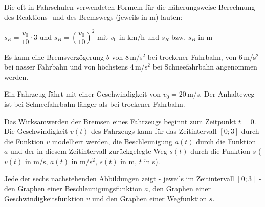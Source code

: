 \begin{langesbeispiel}
\begin{aufgabenstellung}
\item Die oft in Fahrschulen verwendeten Formeln für die näherungsweise Berechnung des Reaktions- und des Bremswegs (jeweils in m) lauten:

	$s_R=\dfrac{v_0}{10}\cdot 3$ und $s_B=\left(\dfrac{v_0}{10}\right)^2$ mit $v_0$ in km/h und $s_R$ bzw. $s_B$ in m%


\item Es kann eine Bremsverzögerung $b$ von 8\,m/s$^2$ bei trockener Fahrbahn, von 6\,m/s$^2$ bei nasser Fahrbahn und von höchstens 4\,m/s$^2$ bei Schneefahrbahn angenommen werden.%


Ein Fahrzeug fährt mit einer Geschwindigkeit von $v_0=20$\,m/s. Der Anhalteweg ist bei Schneefahrbahn länger als bei trockener Fahrbahn.


\item Das Wirksamwerden der Bremsen eines Fahrzeugs beginnt zum Zeitpunkt $t=0$. Die Geschwindigkeit $v(t)$ des Fahrzeugs kann für das Zeitintervall $[0;3]$ durch die Funktion $v$ modelliert werden, die Beschleunigung $a(t)$ durch die Funktion $a$ und der in diesem Zeitintervall zurückgelegte Weg $s(t)$ durch die Funktion $s$ ($v(t)$ in m/s, $a(t)$ in m/s$^2$, $s(t)$ in m, $t$ in s).%


Jede der sechs nachstehenden Abbildungen zeigt - jeweils im Zeitintervall $[0;3]$ - den Graphen einer Beschleunigungsfunktion $a$, den Graphen einer Geschwindigkeitsfunktion $v$ und den Graphen einer Wegfunktion $s$.


\end{aufgabenstellung}
\end{langesbeispiel}
